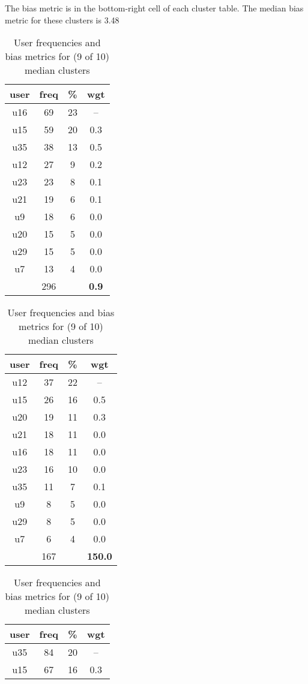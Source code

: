 \begin{appendices}
\begin{table}
\centering
\caption{User frequencies and bias metrics for (9 of 10) median clusters}
{\small The bias metric is in the bottom-right cell of each cluster table. The median bias metric for these clusters is 3.48 \\}
\bigskip
\begin{tabular}{ |c|c|c|c| }
	\hline
	\textbf{user} & \textbf{freq} & \textbf{\%} & \textbf{wgt} \\
	\hline
	u16 & 69 & 23 & -- \\
	u15 & 59 & 20 & 0.3 \\
	u35 & 38 & 13 & 0.5 \\
	u12 & 27 & 9 & 0.2 \\
	u23 & 23 & 8 & 0.1 \\
	u21 & 19 & 6 & 0.1 \\
	u9 & 18 & 6 & 0.0 \\
	u20 & 15 & 5 & 0.0 \\
	u29 & 15 & 5 & 0.0 \\
	u7 & 13 & 4 & 0.0 \\
	 & 296 & & \textbf{0.9} \\
	\hline
\end{tabular}
\begin{tabular}{ |c|c|c|c| }
	\hline
	\textbf{user} & \textbf{freq} & \textbf{\%} & \textbf{wgt} \\
	\hline
	u12 & 37 & 22 & -- \\
	u15 & 26 & 16 & 0.5 \\
	u20 & 19 & 11 & 0.3 \\
	u21 & 18 & 11 & 0.0 \\
	u16 & 18 & 11 & 0.0 \\
	u23 & 16 & 10 & 0.0 \\
	u35 & 11 & 7 & 0.1 \\
	u9 & 8 & 5 & 0.0 \\
	u29 & 8 & 5 & 0.0 \\
	u7 & 6 & 4 & 0.0 \\
	 & 167 & & \textbf{150.0} \\
	\hline
\end{tabular}
\begin{tabular}{ |c|c|c|c| }
	\hline
	\textbf{user} & \textbf{freq} & \textbf{\%} & \textbf{wgt} \\
	\hline
	u35 & 84 & 20 & -- \\
	u15 & 67 & 16 & 0.3 \\

\end{tabular}
\end{table}
\end{appendices}
